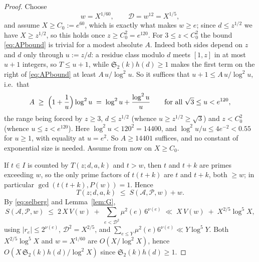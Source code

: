\documentclass[10pt]{article}
\theoremstyle{definition}
\theoremstyle{remark}
\begin{document}
\begin{proof}
Choose
\[
  w = X^{1/60}, \qquad \mathcal{D} = w^{12} = X^{1/5},
\]
and assume $X \ge C_0 := e^{60}$, which is exactly what makes $w \ge e$; since
$d \le z^{1/2}$ we have $X \ge z^{1/2}$, so this holds once
$z \ge C_0^{2} = e^{120}$. For $3 \le z < C_0^{2}$ the bound
\eqref{eq:APbound} is trivial for a modest absolute $A$. Indeed both sides
depend on $z$ and $d$ only through $u := z/d$: a residue class modulo $d$ meets
$[1,z]$ in at most $u + 1$ integers, so $T \le u + 1$, while
$\mathfrak{S}_2(k)h(d) \ge 1$ makes the first term on the right of
\eqref{eq:APbound} at least $A\,u/\log^{2}u$. So it suffices that
$u + 1 \le A\,u/\log^{2}u$, i.e.\ that
\[
  A \;\ge\; \Bigl(1 + \frac1u\Bigr)\log^{2}u
  \;=\; \log^{2}u + \frac{\log^{2}u}{u}
  \qquad \text{for all } \sqrt{3} \le u < e^{120},
\]
the range being forced by $z \ge 3$, $d \le z^{1/2}$ (whence
$u \ge z^{1/2} \ge \sqrt3$) and $z < C_0^2$ (whence $u \le z < e^{120}$). Here
$\log^{2}u < 120^{2} = 14400$, and $\log^{2}u/u \le 4e^{-2} < 0.55$ for
$u \ge 1$, with equality at $u = e^{2}$. So $A \ge 14401$ suffices, and no
constant of exponential size is needed. Assume from now on $X \ge C_0$.

If $t \in I$ is counted by $T(z;d,a,k)$ and $t > w$, then $t$ and $t+k$ are
primes exceeding $w$, so the only prime factors of $t(t+k)$ are $t$ and $t+k$,
both $\ge w$; in particular $\gcd(t(t+k), P(w)) = 1$. Hence
\[
  T(z;d,a,k) \;\le\; S(\mathcal{A}, \mathcal{P}, w) + w .
\]
By \eqref{eq:selberg} and Lemma~\ref{lem:G},
\[
  S(\mathcal{A},\mathcal{P},w)
  \;\le\; 2\,X\,V(w) \;+\; \sum_{e < \mathcal{D}^{2}} \mu^2(e)\,6^{\nu(e)}
  \;\ll\; X\,V(w) \;+\; X^{2/5}\log^{5} X ,
\]
using $|r_e| \le 2^{\nu(e)}$, $\mathcal{D}^2 = X^{2/5}$, and
$\sum_{e \le Y}\mu^2(e)6^{\nu(e)} \ll Y\log^{5}Y$. Both $X^{2/5}\log^5 X$ and
$w = X^{1/60}$ are $O(X/\log^{2}X)$, hence $O(X\,\mathfrak{S}_2(k)h(d)/
\log^2 X)$ since $\mathfrak{S}_2(k)h(d) \ge 1$.


\end{proof}
\end{document}
